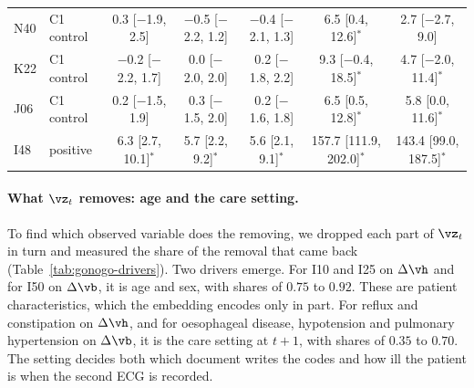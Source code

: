 \begin{table}[t]
{\begin{tabular}{@{}ll ccc cc@{}}
N40 & C1 control & 0.3 [$-$1.9, 2.5] & $-$0.5 [$-$2.2, 1.2] & $-$0.4 [$-$2.1, 1.3] & 6.5 [0.4, 12.6]$^*$ & 2.7 [$-$2.7, 9.0] \\
K22 & C1 control & $-$0.2 [$-$2.2, 1.7] & 0.0 [$-$2.0, 2.0] & 0.2 [$-$1.8, 2.2] & 9.3 [$-$0.4, 18.5]$^*$ & 4.7 [$-$2.0, 11.4]$^*$ \\
J06 & C1 control & 0.2 [$-$1.5, 1.9] & 0.3 [$-$1.5, 2.0] & 0.2 [$-$1.6, 1.8] & 6.5 [0.5, 12.8]$^*$ & 5.8 [0.0, 11.6]$^*$ \\
\addlinespace
I48 & positive & 6.3 [2.7, 10.1]$^*$ & 5.7 [2.2, 9.2]$^*$ & 5.6 [2.1, 9.1]$^*$ & 157.7 [111.9, 202.0]$^*$ & 143.4 [99.0, 187.5]$^*$ \\
\bottomrule
\end{tabular}
}
\end{table}

\paragraph{What $\vz_t$ removes: age and the care setting.} To find which observed variable does the removing, we dropped each part of $\vz_t$ in turn and measured the share of the removal that came back (Table~\ref{tab:gonogo-drivers}). Two drivers emerge. For I10 and I25 on $\Delta\vh$ and for I50 on $\Delta\vb$, it is age and sex, with shares of $0.75$ to $0.92$. These are patient characteristics, which the embedding encodes only in part. For reflux and constipation on $\Delta\vh$, and for oesophageal disease, hypotension and pulmonary hypertension on $\Delta\vb$, it is the care setting at $t+1$, with shares of $0.35$ to $0.70$. The setting decides both which document writes the codes and how ill the patient is when the second ECG is recorded.

